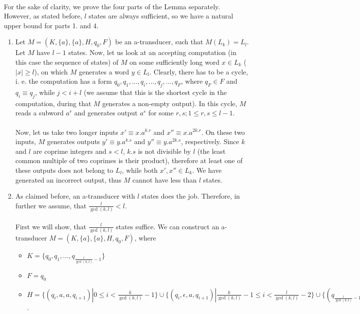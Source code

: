 \paragraph{}
\dokaz For the sake of clarity, we prove the four parts of the Lemma separately. However, as stated before, $l$ states are always sufficient, so we have a natural upper bound for parts 1. and 4.
\begin{enumerate}
\item Let $M = (K, \{a\}, \{a\}, H, q_0, F)$ be an a-transducer, such that $M(L_k) = L_l$. Let $M$ have $l-1$ states. Now, let us look at an accepting computation (in this case the sequence of states) of $M$ on some sufficiently long word $x \in L_k$ ($|x| \geq l$), on which $M$ generates a word $y \in L_l$. Clearly, there has to be a cycle, i. e. the computation has a form $q_0, q_1, ..., q_i, ..., q_j, ..., q_F$, where $q_F \in F$ and $q_i \equiv q_j$, while $j < i + l$ (we assume that this is the shortest cycle in the computation, during that $M$ generates a non-empty output). In this cycle, $M$ reads a subword $a^r$ and generates output $a^s$ for some $r,s; 1 \leq r,s \leq l-1$.

\paragraph{}
Now, let us take two longer inputs $x' \equiv x.a^{k.r}$ and $x'' \equiv x.a^{2k.r}$. On these two inputs, $M$ generates outputs $y' \equiv y.a^{k.s}$ and $y'' \equiv y.a^{2k.s}$, respectively. Since $k$ and $l$ are coprime integers and $s < l$, $k.s$ is not divisible by $l$ (the least common multiple of two coprimes is their product), therefore at least one of these outputs does not belong to $L_l$, while both $x', x'' \in L_k$. We have generated an incorrect output, thus $M$ cannot have less than $l$ states.

\item As claimed before, an a-transducer with $l$ states does the job. Therefore, in further we assume, that $\frac{l}{\gcd(k,l)} < l$.

\paragraph{}
First we will show, that $\frac{l}{\gcd(k,l)}$ states suffice. We can construct an a-transducer $M = (K, \{ a\}, \{ a\}, H, q_0, F)$, where
\begin{itemize}
\item $K = \{ q_0, q_1,  ..., q_{\frac{l}{\gcd(k,l)}-1 }\}$
\item $F = q_0$%
\item $H = \{(q_i, a, a, q_{i+1})| 0 \leq i < \frac{k}{\gcd(k,l)}-1 \} \cup \{(q_i, \epsilon, a, q_{i+1})| \frac{k}{\gcd(k,l)}-1 \leq i < \frac{l}{\gcd(k,l)}-2 \} \cup \{ (q_{\frac{l}{\gcd(k,l)}-1}, \epsilon, a, q_0) \}$.
\end{itemize}


\end{enumerate}

